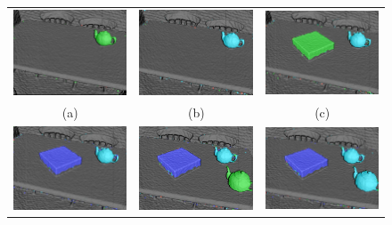\begin{figure}[!htbp]
  \centering
  \begin{tabular}{ccc}
    \includegraphics[width=.3\linewidth]{figures/moseg/objects1.png} &
    \includegraphics[width=.3\linewidth]{figures/moseg/objects2.png} &
    \includegraphics[width=.3\linewidth]{figures/moseg/objects3.png} \\ 
    (a) & (b) & (c) \\
    \includegraphics[width=.3\linewidth]{figures/moseg/objects4.png} &
    \includegraphics[width=.3\linewidth]{figures/moseg/objects5.png} &
    \includegraphics[width=.3\linewidth]{figures/moseg/objects6.png} \\ 

\end{tabular}
\end{figure}
